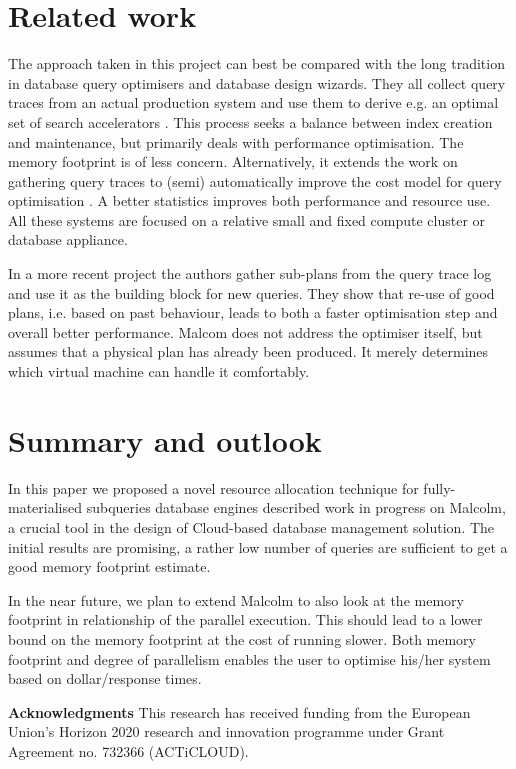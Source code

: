 \documentclass[conference]{IEEEtran}
\def\Skip{\par\medskip\nobreak\noindent}
\begin{document}
\section{Related work}
The approach taken in this project can best be compared with the long tradition in database query optimisers and database design wizards.
They all collect query traces from an actual production system and use them to derive e.g. an optimal set of search accelerators \cite{DBLP:conf/vldb/ChaudhuriN07}.
This process seeks a balance between index creation and maintenance, but primarily deals with performance optimisation.
The memory footprint is of less concern.
Alternatively, it extends the work on gathering query traces to (semi) automatically improve the cost model for query optimisation \cite{DBLP:journals/ibmsj/MarklLR03}.
A better statistics improves both performance and resource use.
All these systems are focused on a relative small and fixed compute cluster or database  appliance.

In a more recent project \cite{DBLP:journals/pvldb/DingDWCN18} the authors gather sub-plans from the query trace log and use it as the building block for new queries.
They show that re-use of good plans, i.e. based on past behaviour, leads to both a faster optimisation step and overall better performance. Malcom does not address the optimiser itself, but assumes that a physical plan has already been produced.
It merely determines which virtual machine can handle it comfortably.

\section{Summary and outlook\label{summary}} 
In this paper we proposed a novel resource allocation technique for fully-materialised subqueries database engines described work in progress on Malcolm, a crucial tool in the design of Cloud-based database management solution.
The initial results are promising, a rather low number of queries are sufficient to get a good memory footprint estimate.

In the near future, we plan to extend Malcolm to also look at the memory footprint in relationship of the parallel execution.
This should lead to a lower bound on the memory footprint at the cost of running slower.
Both memory footprint and degree of parallelism enables the user to optimise his/her system based on dollar/response times.

\Skip\textbf{Acknowledgments}
This research has received funding from the European Union’s Horizon 2020 research and innovation programme under Grant Agreement no. 732366 (ACTiCLOUD).


\end{document}
